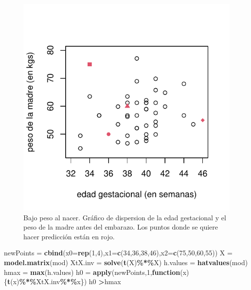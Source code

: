 \documentclass[
]{article}
\newenvironment{Shaded}{\begin{snugshade}}{\end{snugshade}}
\newcommand{\AttributeTok}[1]{\textcolor[rgb]{0.13,0.29,0.53}{#1}}
\newcommand{\ControlFlowTok}[1]{\textcolor[rgb]{0.13,0.29,0.53}{\textbf{#1}}}
\newcommand{\DecValTok}[1]{\textcolor[rgb]{0.00,0.00,0.81}{#1}}
\newcommand{\FunctionTok}[1]{\textcolor[rgb]{0.13,0.29,0.53}{\textbf{#1}}}
\newcommand{\NormalTok}[1]{#1}
\newcommand{\OtherTok}[1]{\textcolor[rgb]{0.56,0.35,0.01}{#1}}
\newcommand{\SpecialCharTok}[1]{\textcolor[rgb]{0.81,0.36,0.00}{\textbf{#1}}}
\begin{document}
\begin{figure}

{\centering \includegraphics{MLG1_files/figure-latex/birthweightExtrapolacion-1} 

}

\caption{Bajo peso al nacer. Gráfico de dispersion de la edad gestacional y el peso de la madre antes del embarazo. Los puntos donde se quiere hacer predicción están en rojo.}\label{fig:birthweightExtrapolacion}
\end{figure}

\begin{Shaded}
\begin{Highlighting}[]
\NormalTok{newPoints }\OtherTok{=} \FunctionTok{cbind}\NormalTok{(}\AttributeTok{x0=}\FunctionTok{rep}\NormalTok{(}\DecValTok{1}\NormalTok{,}\DecValTok{4}\NormalTok{),}\AttributeTok{x1=}\FunctionTok{c}\NormalTok{(}\DecValTok{34}\NormalTok{,}\DecValTok{36}\NormalTok{,}\DecValTok{38}\NormalTok{,}\DecValTok{46}\NormalTok{),}\AttributeTok{x2=}\FunctionTok{c}\NormalTok{(}\DecValTok{75}\NormalTok{,}\DecValTok{50}\NormalTok{,}\DecValTok{60}\NormalTok{,}\DecValTok{55}\NormalTok{))}
\NormalTok{X }\OtherTok{=} \FunctionTok{model.matrix}\NormalTok{(mod)}
\NormalTok{XtX.inv }\OtherTok{=} \FunctionTok{solve}\NormalTok{(}\FunctionTok{t}\NormalTok{(X)}\SpecialCharTok{\%*\%}\NormalTok{X)}
\NormalTok{h.values }\OtherTok{=} \FunctionTok{hatvalues}\NormalTok{(mod)}
\NormalTok{hmax }\OtherTok{=} \FunctionTok{max}\NormalTok{(h.values)}
\NormalTok{h0 }\OtherTok{=} \FunctionTok{apply}\NormalTok{(newPoints,}\DecValTok{1}\NormalTok{,}\ControlFlowTok{function}\NormalTok{(x)\{}\FunctionTok{t}\NormalTok{(x)}\SpecialCharTok{\%*\%}\NormalTok{XtX.inv}\SpecialCharTok{\%*\%}\NormalTok{x\})}
\NormalTok{h0 }\SpecialCharTok{\textgreater{}}\NormalTok{hmax}
\end{Highlighting}
\end{Shaded}
\end{document}
